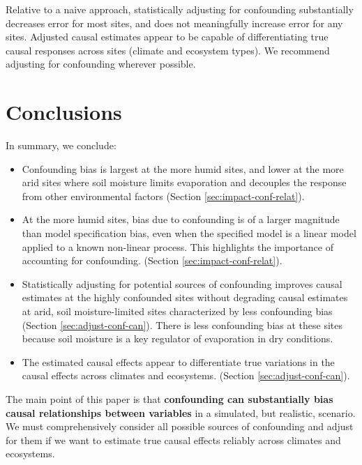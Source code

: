 \documentclass[12pt]{article}
\begin{document}
Relative to a naive approach, statistically adjusting for confounding
substantially decreases error for most sites, and does not meaningfully
increase error for any sites. Adjusted causal estimates appear to be
capable of differentiating true causal responses across sites (climate
and ecosystem types). We recommend adjusting for confounding wherever
possible.

\section{Conclusions}
\label{sec:conclusions}

In summary, we conclude:

  \begin{itemize}
    \item Confounding bias is largest at the more humid sites, and
      lower at the more arid sites where soil moisture limits
      evaporation and decouples the response from other environmental
      factors (Section \ref{sec:impact-conf-relat}).
  \item At the more humid sites, bias due to confounding is of a
    larger magnitude than model specification bias, even when the
    specified model is a linear model applied to a known non-linear
    process. This highlights the importance of accounting for
    confounding. (Section \ref{sec:impact-conf-relat}).
  \item Statistically adjusting for potential sources of confounding
    improves causal estimates at the highly confounded sites without
    degrading causal estimates at arid, soil moisture-limited sites
    characterized by less confounding bias (Section
    \ref{sec:adjust-conf-can}). There is less confounding bias at
    these sites because soil moisture is a key regulator of
    evaporation in dry conditions.

    \item The estimated causal effects appear to differentiate true
      variations in the causal effects across climates and
      ecosystems. (Section \ref{sec:adjust-conf-can}).
  \end{itemize}

The main point of this paper is that \textbf{confounding can
  substantially bias causal relationships between variables} in a
simulated, but realistic, scenario. We must comprehensively consider
all possible sources of confounding and adjust for them if we want
to estimate true causal effects reliably across climates and
ecosystems.
\end{document}
